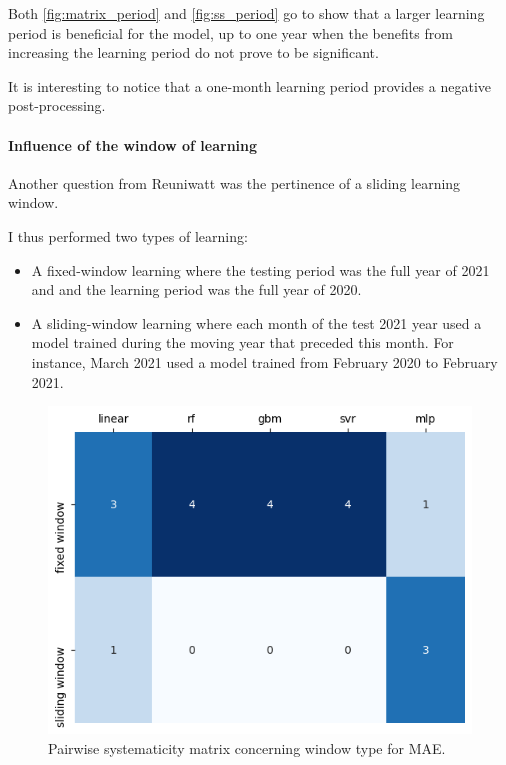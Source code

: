 Both \autoref{fig:matrix_period} and \autoref{fig:ss_period} go to show that a larger learning period is beneficial for the model, up to one year when 
the benefits from increasing the learning period do not prove to be significant.

It is interesting to notice that a one-month learning period provides a negative post-processing.
\paragraph{Influence of the window of learning}
\indent 

Another question from Reuniwatt was the pertinence of a sliding learning window.

I thus performed two types of learning:
\begin{itemize}
    \item A fixed-window learning where the testing period was the full year of 2021 and and the learning period was the full year of 2020.
    \item A sliding-window learning where each month of the test 2021 year used a model trained during the moving year that preceded this month. For instance, March 2021 used a model trained from February 2020 to February 2021.
\end{itemize}
\newpage
\begin{figure}[htb!]
    \centering
    \includegraphics[width=0.7\columnwidth]{figures/first_study/comp_window_mae.png}
\caption{Pairwise systematicity matrix concerning window type for MAE.}
\end{figure}

